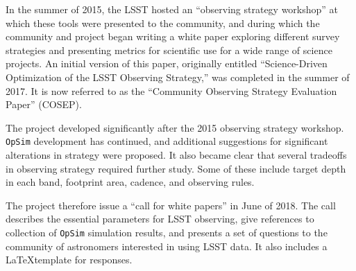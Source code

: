 In the summer of 2015, the LSST hosted an ``observing strategy
workshop'' at which these tools were presented to the community, and
during which the community and project began writing a white paper
exploring different survey strategies and presenting metrics for
scientific use for a wide range of science projects. An initial
version of this paper, originally entitled ``Science-Driven
Optimization of the LSST Observing Strategy,'' was completed in the
summer of 2017. It is now referred to as the ``Community Observing
Strategy Evaluation Paper'' (COSEP).

The project developed significantly after the 2015 observing
strategy workshop. {\tt OpSim} development has continued, and
additional suggestions for significant alterations in strategy were
proposed. It also became clear that several tradeoffs in observing
strategy required further study. Some of these include target depth in
each band, footprint area, cadence, and observing rules.

The project therefore issue a ``call for white papers'' in June of
2018. The call describes the essential parameters for LSST observing,
give references to collection of {\tt OpSim} simulation results, and
presents a set of questions to the community of astronomers interested
in using LSST data. It also includes a \LaTeX  template for responses.
